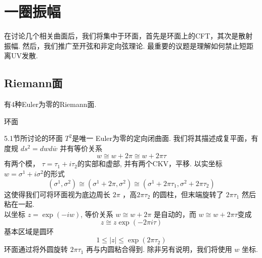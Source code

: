 \setcounter{section}{0}%
\setcounter{chapter}{6}

\chapter{一圈振幅}
在讨论几个相关曲面后，我们将集中于环面，首先是环面上的CFT，其次是散射振幅. 然后，我们推广至开弦和非定向弦理论. 最重要的议题是理解如何禁止短距离UV发散.

\section{Riemann面}
有4种Euler为零的Riemann面.\\

\centerline{\Large 环面}
5.1节所讨论的环面 $T^{2}$是唯一 Euler为零的定向闭曲面. 我们将其描述成复平面，有度规 $d s^{2}=d w d \bar{w}$ 并有等价关系
\begin{equation}
	w \cong w+2 \pi \cong w+2 \pi \tau
\end{equation}
有两个模， $\tau=\tau_{1}+i \tau_{2}$的实部和虚部, 并有两个CKV，平移. 以实坐标 $w=\sigma^{1}+i \sigma^{2}$的形式
\begin{equation}
	\left(\sigma^{1}, \sigma^{2}\right) \cong\left(\sigma^{1}+2 \pi, \sigma^{2}\right) \cong\left(\sigma^{1}+2 \pi \tau_{1}, \sigma^{2}+2 \pi \tau_{2}\right)
\end{equation}
这使得我们可将环面视为底边周长 $2 \pi$ ，高$2 \pi \tau_{2}$ 的圆柱，但末端旋转了 $2 \pi \tau_{1}$ 然后粘在一起.\\
以坐标 $z=\exp (-i w)$, 等价关系 $w \cong w+2 \pi$ 是自动的，而 $w \cong w+2 \pi \tau$变成
\begin{equation}
	z \cong z \exp (-2 \pi i \tau)
\end{equation}
基本区域是圆环
\begin{equation}
	1 \leq|z| \leq \exp \left(2 \pi \tau_{2}\right)
\end{equation}
环面通过将外圆旋转 $2 \pi \tau_{1}$ 再与内圆粘合得到. 除非另有说明，我们将使用 $w$ 坐标.\\

